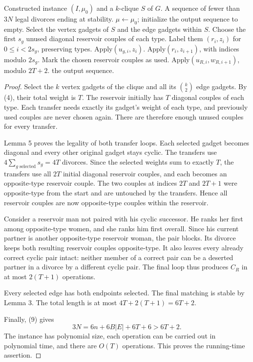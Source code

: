 \documentclass[11pt,letterpaper]{article}
\theoremstyle{definition}
\begin{document}
\begin{algorithm}[!t]
\caption{A successful divorce sequence from a clique}
\begin{algorithmic}[1]
\Require Constructed instance $(I,\mu_0)$ and a $k$-clique $S$ of $G$.
\Ensure A sequence of fewer than $3N$ legal divorces ending at stability.
\State $\mu\gets\mu_0$; initialize the output sequence to empty.
\State Select the vertex gadgets of $S$ and the edge gadgets within $S$.
\State Choose the first $s_g$ unused diagonal reservoir couples of each type.
\State Label them $(r_i,z_i)$ for $0\le i<2s_g$, preserving types.
\State Apply$(u_{g,i},z_i)$.
\EndFor
{}
\State Apply$(r_i,z_{i+1})$, with indices modulo $2s_g$.
\EndFor
\State Mark the chosen reservoir couples as used.
\EndFor
{}
\State Apply$(u_{R,i},w_{R,i+1})$, modulo $2T+2$.
\EndIf
\EndFor
\State \Return the output sequence.
\end{algorithmic}
\end{algorithm}
\begin{proof}
Select the $k$ vertex gadgets of the clique and all its $\binom{k}{2}$ edge gadgets. By (4), their total weight is $T$. The reservoir initially has $T$ diagonal couples of each type. Each transfer needs exactly its gadget's weight of each type, and previously used couples are never chosen again. There are therefore enough unused couples for every transfer.

Lemma 5 proves the legality of both transfer loops. Each selected gadget becomes diagonal and every other original gadget stays cyclic. The transfers use $4\sum_{g\text{ selected}}s_g=4T$ divorces. Since the selected weights sum to exactly $T$, the transfers use all $2T$ initial diagonal reservoir couples, and each becomes an opposite-type reservoir couple. The two couples at indices $2T$ and $2T+1$ were opposite-type from the start and are untouched by the transfers. Hence all reservoir couples are now opposite-type couples within the reservoir.

Consider a reservoir man not paired with his cyclic successor. He ranks her first among opposite-type women, and she ranks him first overall. Since his current partner is another opposite-type reservoir woman, the pair blocks. Its divorce keeps both resulting reservoir couples opposite-type. It also leaves every already correct cyclic pair intact: neither member of a correct pair can be a deserted partner in a divorce by a different cyclic pair. The final loop thus produces $C_R$ in at most $2(T+1)$ operations.

Every selected edge has both endpoints selected. The final matching is stable by Lemma 3. The total length is at most $4T+2(T+1)=6T+2$.

Finally, (9) gives
\[
3N=6n+6B|E|+6T+6>6T+2.
\]
The instance has polynomial size, each operation can be carried out in polynomial time, and there are $O(T)$ operations. This proves the running-time assertion.
\end{proof}
\end{document}
